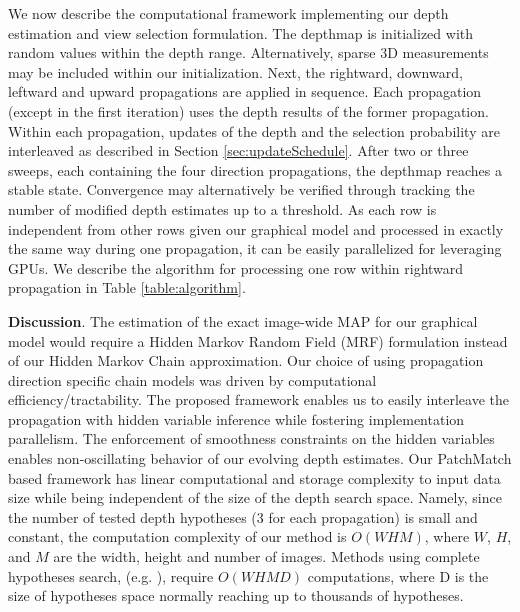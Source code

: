 We now describe the computational framework implementing our  depth estimation and view selection formulation.
The depthmap is initialized with random values within the depth range. Alternatively, sparse 3D measurements may be included within our initialization. Next, the rightward, downward, leftward and upward propagations are applied in sequence. Each propagation (except in the first iteration) uses the depth results of the former propagation. Within each propagation, updates of the depth and the selection probability are interleaved as described in Section \ref{sec:updateSchedule}. After two or three sweeps, each containing the four direction propagations, the depthmap reaches a stable state.  Convergence may alternatively be verified through tracking the number of modified depth estimates up to a threshold. As each row is independent from other rows given our graphical model and processed in exactly the same way during one propagation, it can be easily parallelized for leveraging GPUs. We describe the algorithm for processing one row within rightward propagation in Table \ref{table:algorithm}.



{\bf Discussion}.
The estimation of the exact image-wide MAP for our graphical model would require a Hidden Markov Random Field (MRF) formulation instead of our Hidden Markov Chain approximation.
Our choice of using propagation direction specific chain models was driven by computational efficiency/tractability.
The proposed framework enables us to easily interleave the propagation with hidden variable inference while fostering implementation  parallelism.
The enforcement of smoothness constraints on the hidden variables  enables non-oscillating behavior of our evolving depth estimates.
Our PatchMatch based  framework has linear computational and storage complexity \wrt to input data size while being independent of the size of the depth search space.
Namely, since the number of tested depth hypotheses (3 for each propagation) is small and constant, the computation complexity of our method is $O(W H M)$, where $W$, $H$, and $M$ are the width, height and  number of images.  Methods using complete hypotheses search, (e.g. \citet{Sun_ECCV2002_stereoBeliefProp, CombinedDepthOutlier}), require  $O(W H M D)$ computations, where D is the size of hypotheses space
normally reaching up to thousands of hypotheses.
 
